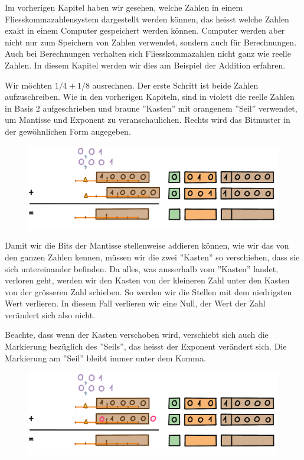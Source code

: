 Im vorherigen Kapitel haben wir gesehen, welche Zahlen in einem Fliesskommazahlensystem dargestellt werden können, das heisst welche Zahlen  exakt in einem Computer gespeichert werden können. Computer werden aber nicht nur zum Speichern von Zahlen verwendet, sondern auch für Berechnungen.  Auch bei Berechnungen verhalten sich Fliesskommazahlen nicht ganz wie reelle Zahlen. In diesem Kapitel werden wir dies am Beispiel der Addition erfahren. 

\begin{beispiel}
Wir möchten \(1/4 + 1/8\) ausrechnen. Der erste Schritt ist beide Zahlen aufzuschreiben. Wie in den vorherigen Kapiteln, sind in violett die reelle Zahlen in Basis 2 aufgeschrieben und braune ''Kasten'' mit orangenem ''Seil'' verwendet, um Mantisse und Exponent zu veranschaulichen. Rechts wird das Bitmuster in der gewöhnlichen Form angegeben.
\begin{figure}[H]
\centering
\includegraphics[width=\linewidth]{Pictures/Addition1-4and1-8_1.png}
\end{figure}

Damit wir die Bits der Mantisse stellenweise addieren können, wie wir das von den ganzen Zahlen kennen, müssen wir die zwei ''Kasten'' so verschieben, dass sie sich untereinander befinden. Da alles, was ausserhalb vom ''Kasten'' landet, verloren geht, werden wir den Kasten von der kleineren Zahl unter den Kasten von der grösseren Zahl schieben. So werden wir die Stellen mit dem niedrigsten Wert verlieren. In diesem Fall verlieren wir eine Null, der Wert der Zahl verändert sich also nicht.

Beachte, dass wenn der Kasten verschoben wird, verschiebt sich auch die Markierung bezüglich des ''Seils'', das heisst der Exponent verändert sich. Die Markierung am ''Seil'' bleibt immer unter dem Komma.
\begin{figure}[H]
\centering
\includegraphics[width=\linewidth]{Pictures/Addition1-4and1-8_2.png}
\end{figure}


\end{beispiel}
